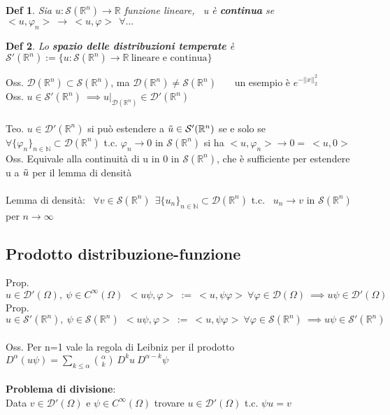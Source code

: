 \documentclass{article}
\theoremstyle{unnumbered}
\newtheorem* {theoremT}{Def}
\theoremstyle{unnumbered1}
\newenvironment{defi}{\begin{gBox}\begin{theoremT}}{\end{theoremT}\end{gBox}}
\renewcommand{\phi}{\varphi}
\begin{document}
\begin{defi}
Sia $u:\mathcal{S}(\mathbb{R}^n)\to\mathbb{R}$ funzione lineare, \ u è \textbf{continua} se $<u,\phi_n>\ \to \ <u,\phi> \ \ \forall ...$
\end{defi}

\begin{defi}
Lo \textbf{spazio delle distribuzioni temperate} è \ $\mathcal{S}'(\mathbb{R}^n):=\{u:\mathcal{S}(\mathbb{R}^n)\to\mathbb{R} \ \text{lineare e continua}\}$
\end{defi}
%
Oss. $\mathcal{D}(\mathbb{R}^n)\subset\mathcal{S}(\mathbb{R}^n)$, ma $\mathcal{D}(\mathbb{R}^n)\ne\mathcal{S}(\mathbb{R}^n)$ \ \ \ un esempio è $e^{-||x||_2^2}$\\
Oss. $u\in\mathcal{S}'(\mathbb{R}^n) \ \implies u|_{\mathcal{D}(\mathbb{R}^n)}\in\mathcal{D}'(\mathbb{R}^n)$\\ \\
%
%
Teo. $u\in\mathcal{D}'(\mathbb{R}^n)$ si può estendere a $\Tilde{u}\in\mathcal{S}'(\mathbb{R}^n)$ se e solo se\\ $\forall\{\phi_n\}_{n\in\mathbb{N}}\subset\mathcal{D}(\mathbb{R}^n)$ t.c. $\phi_n\to 0$ in $\mathcal{S}(\mathbb{R}^n)$ si ha $<u,\phi_n>\to 0 = \ <u,0>$\\
Oss. Equivale alla continuità di u in 0 in $\mathcal{S}(\mathbb{R}^n)$, che è sufficiente per estendere u a $\Tilde{u}$ per il lemma di densità\\ \\
%
%
Lemma di densità: \ $\forall v\in\mathcal{S}(\mathbb{R}^n) \ \ \exists \{u_n\}_{n\in\mathbb{N}}\subset\mathcal{D}(\mathbb{R}^n)$ t.c. \ $u_n\to v$ in $\mathcal{S}(\mathbb{R}^n)$ per $n\to\infty$\\
%
%


\subsection{Prodotto distribuzione-funzione}

Prop. $u\in\mathcal{D}'(\Omega),\ \psi\in C^{\infty}(\Omega) \ \ <u\psi,\phi>\ := \ <u,\psi\phi> \ \forall\phi\in\mathcal{D}(\Omega) \ \implies u\psi\in\mathcal{D}'(\Omega)$\\
%
Prop. $u\in\mathcal{S}'(\mathbb{R}^n),\ \psi\in \mathcal{S}(\mathbb{R}^n) \ \ <u\psi,\phi>\ := \ <u,\psi\phi> \ \forall\phi\in\mathcal{S}(\mathbb{R}^n) \ \implies u\psi\in\mathcal{S}'(\mathbb{R}^n)$\\ \\
%
%
Oss. Per n=1 vale la regola di Leibniz per il prodotto \ \ $D^{\alpha}(u\psi)=\sum_{k\le\alpha}\binom{\alpha}{k}\ D^ku\ D^{\alpha-k}\psi$\\ \\
%
%
\textbf{Problema di divisione}:\\
Data $v\in\mathcal{D}'(\Omega)$ e $\psi\in C^{\infty}(\Omega)$ trovare $u\in\mathcal{D}'(\Omega)$ t.c. $\psi u=v$\\
\end{document}
